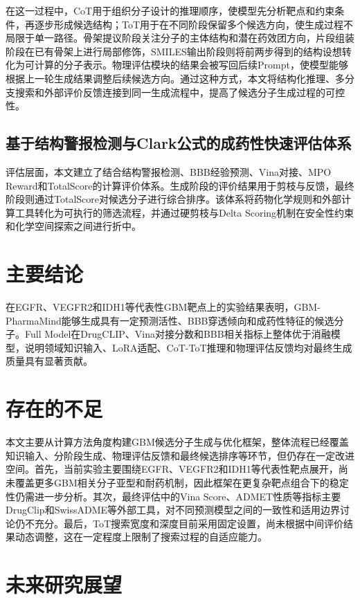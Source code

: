 在这一过程中，CoT用于组织分子设计的推理顺序，使模型先分析靶点和约束条件，再逐步形成候选结构；ToT用于在不同阶段保留多个候选方向，使生成过程不局限于单一路径。骨架提议阶段关注分子的主体结构和潜在药效团方向，片段组装阶段在已有骨架上进行局部修饰，SMILES输出阶段则将前两步得到的结构设想转化为可计算的分子表示。物理评估模块的结果会被写回后续Prompt，使模型能够根据上一轮生成结果调整后续候选方向。通过这种方式，本文将结构化推理、多分支搜索和外部评价反馈连接到同一生成流程中，提高了候选分子生成过程的可控性。

\subsection{基于结构警报检测与Clark公式的成药性快速评估体系}\label{sec:work-physics}

评估层面，本文建立了结合结构警报检测、BBB经验预测、Vina对接、MPO Reward和TotalScore的计算评价体系。生成阶段的评价结果用于剪枝与反馈，最终阶段则通过TotalScore对候选分子进行综合排序。该体系将药物化学规则和外部计算工具转化为可执行的筛选流程，并通过硬剪枝与Delta Scoring机制在安全性约束和化学空间探索之间进行折中。

\section{主要结论}\label{sec:conclusions}

在EGFR、VEGFR2和IDH1等代表性GBM靶点上的实验结果表明，GBM-PharmaMind能够生成具有一定预测活性、BBB穿透倾向和成药性特征的候选分子。Full Model在DrugCLIP、Vina对接分数和BBB相关指标上整体优于消融模型，说明领域知识输入、LoRA适配、CoT-ToT推理和物理评估反馈均对最终生成质量具有显著贡献。

\section{存在的不足}\label{sec:limitations}

本文主要从计算方法角度构建GBM候选分子生成与优化框架，整体流程已经覆盖知识输入、分阶段生成、物理评估反馈和最终候选排序等环节，但仍存在一定改进空间。首先，当前实验主要围绕EGFR、VEGFR2和IDH1等代表性靶点展开，尚未覆盖更多GBM相关分子亚型和耐药机制，因此框架在更复杂靶点组合下的稳定性仍需进一步分析。其次，最终评估中的Vina Score、ADMET性质等指标主要DrugClip和SwissADME等外部工具，对不同预测模型之间的一致性和适用边界讨论仍不充分。最后，ToT搜索宽度和深度目前采用固定设置，尚未根据中间评价结果动态调整，这在一定程度上限制了搜索过程的自适应能力。

\section{未来研究展望}\label{sec:future}

